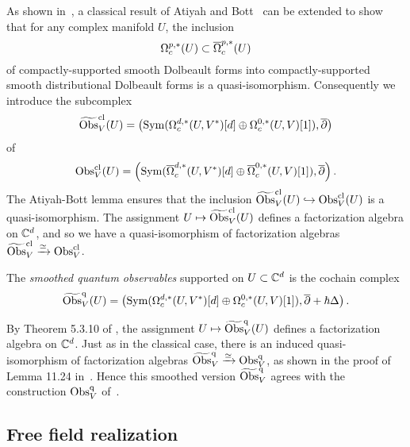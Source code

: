 As shown in~\cite{CG1},
a classical result of Atiyah and Bott~\cite{AB} can be extended to show that for any complex manifold $U$, 
the inclusion
\[
\Omega^{p,*}_c(U) \subset \Bar{\Omega}^{p,*}_c(U)
\]
of compactly-supported smooth Dolbeault forms into compactly-supported smooth distributional Dolbeault forms is a quasi-isomorphism. 
Consequently we introduce the subcomplex 
\[
\Tilde{\Obs}^{\cl}_V(U) =  \left(\Sym(\Omega^{d,*}_c(U,V^*)[d] \oplus \Omega^{0,*}_c(U,V)[1]), \dbar\right)
\]
of 
\[
\Obs_V^{\cl}(U) = \left(\Sym(\Bar{\Omega}^{d,*}_c(U,V^*)[d] \oplus \Bar{\Omega}^{0,*}_c(U,V)[1]), \dbar \right).
\]
The Atiyah-Bott lemma ensures that the inclusion $\Tilde{\Obs}^{\cl}_V(U) \hookrightarrow \Obs_V^{\cl}(U)$ is a quasi-isomorphism.
The assignment $U \mapsto \Tilde{\Obs}^{\cl}_V(U)$ defines a factorization algebra on $\CC^d$, 
and so we have a quasi-isomorphism of factorization algebras $\Tilde{\Obs}^{\cl}_V \xto{\simeq} \Obs^{\cl}_V$.


\begin{dfn}\label{dfn: qobs}
The {\em smoothed quantum observables} supported on $U \subset \CC^d$ is the cochain complex
\[
\Tilde{\Obs}^\q_V(U) = \left(\Sym(\Omega^{d,*}_c(U,V^*)[d] \oplus \Omega^{0,*}_c(U,V)[1]), \dbar + \hbar \Delta\right) .
\]
\end{dfn}

By Theorem 5.3.10 of \cite{GwThesis}, the assignment $U \mapsto \Tilde{\Obs}^\q_V(U)$ defines a factorization algebra on $\CC^d$. 
Just as in the classical case, there is an induced quasi-isomorphism of factorization algebras $\Tilde{\Obs}^\q_{V} \xto{\simeq} \Obs^\q_V$,
as shown in the proof of Lemma 11.24 in~\cite{GGW}. 
Hence this smoothed version $\Tilde{\Obs}^\q_{V}$ agrees with the construction $\Obs^\q_V$ of~\cite{CG2}.

\subsection{Free field realization}

